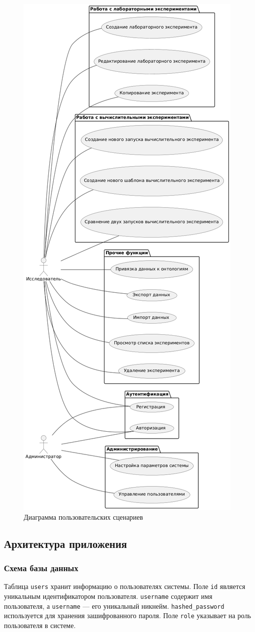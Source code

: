 \begin{figure}[H]
    \centering
    \includegraphics[width=0.5\linewidth]{img/use_cases.png}
    \caption{Диаграмма пользовательских сценариев}
    \label{pic:uc}
\end{figure}

\subsection{Архитектура приложения}

\subsubsection{Схема базы данных}

Таблица \texttt{users} хранит информацию о пользователях системы. Поле \texttt{id} является уникальным идентификатором пользователя. \texttt{username} содержит имя пользователя, а \texttt{username} — его уникальный никнейм. \texttt{hashed\_password} используется для хранения зашифрованного пароля. Поле \texttt{role} указывает на роль пользователя в системе.

